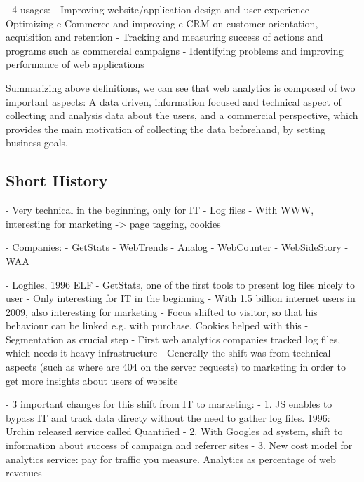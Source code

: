 

- 4 usages:
- Improving website/application design and user experience
- Optimizing e-Commerce and improving e-CRM on customer orientation, acquisition and retention
- Tracking and measuring success of actions and programs such as commercial campaigns
- Identifying problems and improving performance of web applications

Summarizing above definitions, we can see that web analytics is composed of two important aspects: A data driven, information focused and technical aspect of collecting and analysis data about the users, and a commercial perspective, which provides the main motivation of collecting the data beforehand, by setting business goals.










\subsection{Short History}


- Very technical in the beginning, only for IT
- Log files
- With WWW, interesting for marketing -> page tagging, cookies

- Companies:
- GetStats
- WebTrends
- Analog
- WebCounter
- WebSideStory
- WAA


- Logfiles, 1996 ELF
- GetStats, one of the first tools to present log files nicely to user
- Only interesting for IT in the beginning
- With 1.5 billion internet users in 2009, also interesting for marketing
- Focus shifted to visitor, so that his behaviour can be linked e.g. with purchase.  Cookies helped with this
- Segmentation as crucial step
- First web analytics companies tracked log files, which needs it heavy infrastructure
- Generally the shift was from technical aspects (such as where are 404 on the server requests) to marketing in order to get more insights about users of website

- 3 important changes for this shift from IT to marketing:
- 1.  JS enables to bypass IT and track data directy without the need to gather log files. 1996: Urchin released service called Quantified
- 2.  With Googles ad system, shift to information about success of campaign and referrer sites
- 3. New cost model for analytics service: pay for traffic you measure. Analytics as percentage of web revenues

